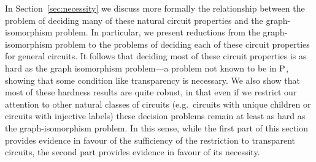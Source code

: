 \documentclass[../paper.tex]{subfiles}
\begin{document}
In Section~\ref{sec:necessity} we discuss more formally the relationship
between the problem of deciding many of these natural circuit properties and the
graph-isomorphism problem. In particular, we present reductions from the
graph-isomorphism problem to the problems of deciding each of these circuit
properties for general circuits. It follows that deciding most of these circuit
properties is as hard as the graph isomorphism problem---a problem not known to be
in $\mathrm{P}$, showing that some condition like transparency is necessary.  We also show that most of these hardness results are quite robust, in
that even if we restrict our attention to other natural classes of circuits
(e.g.\ circuits with unique children or circuits with injective labels) these
decision problems remain at least as hard as the graph-isomorphism problem.
In this sense, while the first part of this section provides evidence in favour of the
sufficiency of the restriction to transparent circuits, the second part provides
evidence in favour of its necessity.










\end{document}
